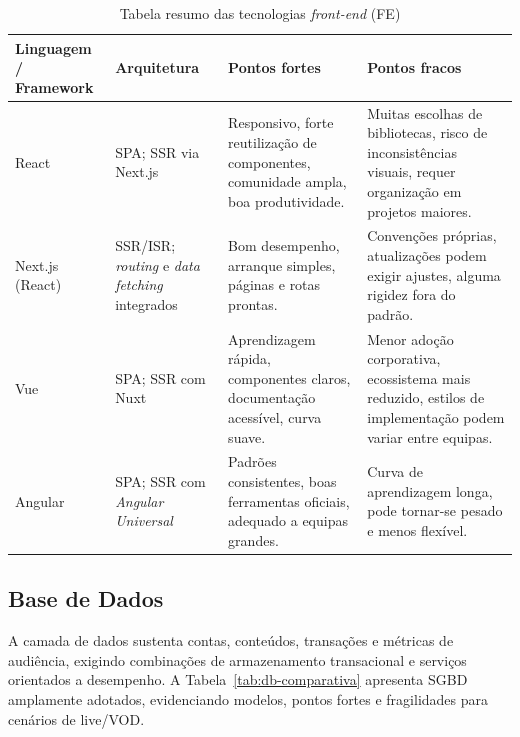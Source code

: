 \begin{table}[H]
\caption{Tabela resumo das tecnologias \textit{front-end} (FE)}
\label{tab:fe-comparativa}
\begin{center}
\small
\begin{tabular}{|p{2.4cm}|p{2.5cm}|p{4cm}|p{4cm}|}
\hline
\textbf{Linguagem / Framework} & \textbf{Arquitetura} & \textbf{Pontos fortes} & \textbf{Pontos fracos} \\ \hline

React & \gls{SPA}; \gls{SSR} via Next.js &
Responsivo, forte reutilização de componentes, comunidade ampla, boa produtividade. &
Muitas escolhas de bibliotecas, risco de inconsistências visuais, requer organização em projetos maiores. \\ \hline

Next.js (React) & SSR/ISR; \textit{routing} e \textit{data fetching} integrados &
Bom desempenho, arranque simples, páginas e rotas prontas. &
Convenções próprias, atualizações podem exigir ajustes, alguma rigidez fora do padrão. \\ \hline

Vue & SPA; SSR com Nuxt &
Aprendizagem rápida, componentes claros, documentação acessível, curva suave. &
Menor adoção corporativa, ecossistema mais reduzido, estilos de implementação podem variar entre equipas. \\ \hline

Angular & SPA; SSR com \textit{Angular Universal} &
Padrões consistentes, boas ferramentas oficiais, adequado a equipas grandes. &
Curva de aprendizagem longa, pode tornar-se pesado e menos flexível. \\ \hline

\end{tabular}
\end{center}
\end{table}

\subsection{Base de Dados}

A camada de dados sustenta contas, conteúdos, transações e métricas de audiência, exigindo combinações de armazenamento transacional e serviços orientados a desempenho. A Tabela~\ref{tab:db-comparativa} apresenta SGBD amplamente adotados, evidenciando modelos, pontos fortes e fragilidades para cenários de live/VOD.

